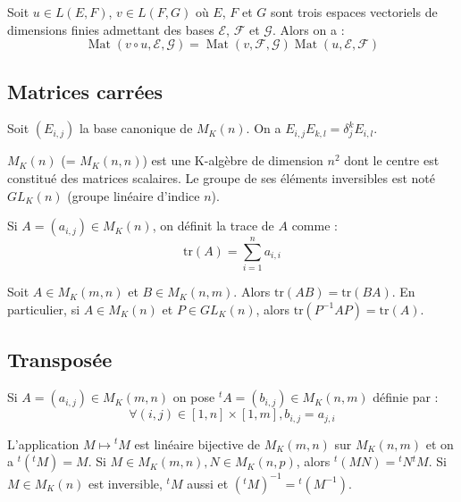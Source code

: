 \begin{thm}
Soit $u \in L(E,F)$, $v \in L(F,G)$ où $E$, $F$ et $G$ sont trois espaces vectoriels de dimensions finies admettant des bases $\mathcal{E}$, $\mathcal{F}$ et $\mathcal{G}$. Alors on a :
\[ \operatorname{Mat}(v \circ u,\mathcal{E},\mathcal{G}) = \operatorname{Mat}(v,\mathcal{F},\mathcal{G})\operatorname{Mat}(u,\mathcal{E},\mathcal{F}) \]
\end{thm}

\subsection{Matrices carrées}

\begin{lem}
Soit $(E_{i,j})$ la base canonique de $M_K(n)$. On a $E_{i,j}E_{k,l} = \delta_j^k E_{i,l}$.
\end{lem}

\begin{prop}
$M_K(n)$ (= $M_K(n,n)$) est une K-algèbre de dimension $n^2$ dont le centre est constitué des matrices scalaires. Le groupe de ses éléments inversibles est noté $GL_K(n)$ (groupe linéaire d'indice $n$).
\end{prop}

\begin{de}
Si $A = (a_{i,j}) \in M_K(n)$, on définit la trace de $A$ comme :
\[ \mathrm{tr}(A) = \sum_{i=1}^n a_{i,i} \]
\end{de}

\begin{thm}
Soit $A \in M_K(m,n)$ et $B \in M_K(n,m)$. Alors $\mathrm{tr}(AB) = \mathrm{tr}(BA)$. En particulier, si $A \in M_K(n)$ et $P \in GL_K(n)$, alors $\mathrm{tr}(P^{-1}AP) = \mathrm{tr}(A)$.
\end{thm}

\subsection{Transposée}

\begin{de}
Si $A = (a_{i,j}) \in M_K(m,n)$ on pose ${}^tA = (b_{i,j}) \in M_K(n,m)$ définie par :
\[ \forall (i,j) \in [1,n] \times [1,m], b_{i,j} = a_{j,i} \]
\end{de}

\begin{prop}
L'application $M \mapsto {}^tM$ est linéaire bijective de $M_K(m,n)$ sur $M_K(n,m)$ et on a ${}^t({}^tM) = M$. Si $M \in M_K(m,n), N \in M_K(n,p)$, alors ${}^t(MN) = {}^tN{}^tM$. Si $M \in M_K(n)$ est inversible, ${}^tM$ aussi et $({}^tM)^{-1} = {}^t(M^{-1})$.
\end{prop}

